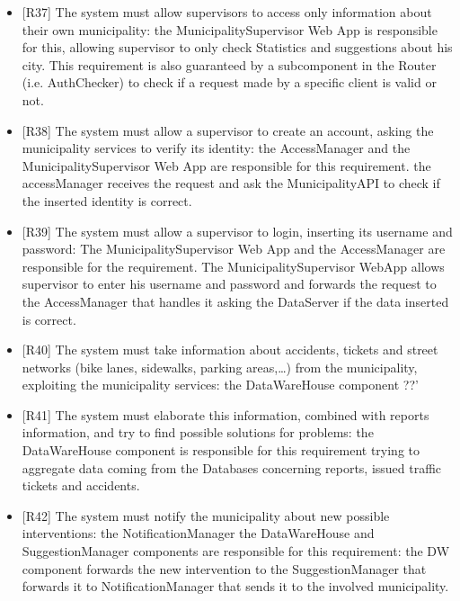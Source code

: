 \documentclass[a4paper]{report}
\begin{document}
\begin{itemize}
\item {[R37]}	\label{R37}The system must allow supervisors to access only information about their own municipality: the MunicipalitySupervisor Web App  is responsible for this, allowing supervisor to only check Statistics and suggestions about his city. This requirement is also guaranteed by a subcomponent in the Router (i.e. AuthChecker) to check if a request made by a specific client is valid or not.
\item {[R38]}	\label{R38}The system must allow a supervisor to create an account, asking the municipality services to verify its identity: the AccessManager and the MunicipalitySupervisor Web App are responsible for this requirement. the accessManager receives the request and ask the MunicipalityAPI to check if the inserted identity is correct.
\item {[R39]}	\label{R39}The system must allow a supervisor to login, inserting its username and password: The MunicipalitySupervisor Web App and the AccessManager are responsible for the requirement. The MunicipalitySupervisor WebApp allows supervisor to enter his username and password and forwards the request to the AccessManager that handles it asking the DataServer if the data inserted is correct.
\item {[R40]}	\label{R40}The system must take information about accidents, tickets and street networks (bike lanes, sidewalks, parking areas,…) from the municipality, exploiting the municipality services: the DataWareHouse component ??'
\item {[R41]}	\label{R41}The system must elaborate this information, combined with reports information, and try to find possible solutions for problems: the DataWareHouse component is responsible for this requirement trying to aggregate data coming from the Databases concerning reports, issued traffic tickets and accidents.
\item {[R42]}	\label{R42}The system must notify the municipality about new possible interventions: the NotificationManager the DataWareHouse and SuggestionManager components are responsible for this requirement: the DW component forwards the new intervention to the SuggestionManager that forwards it to NotificationManager that sends it to  the involved municipality.
\end{itemize}
\end{document}
